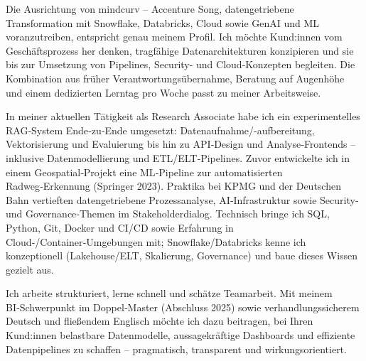 Die Ausrichtung von mindcurv – Accenture Song, datengetriebene Transformation mit Snowflake, Databricks, Cloud sowie GenAI und ML voranzutreiben, entspricht genau meinem Profil. Ich möchte Kund:innen vom Geschäftsprozess her denken, tragfähige Datenarchitekturen konzipieren und sie bis zur Umsetzung von Pipelines, Security- und Cloud-Konzepten begleiten. Die Kombination aus früher Verantwortungsübernahme, Beratung auf Augenhöhe und einem dedizierten Lerntag pro Woche passt zu meiner Arbeitsweise.

In meiner aktuellen Tätigkeit als Research Associate habe ich ein experimentelles RAG‑System Ende‑zu‑Ende umgesetzt: Datenaufnahme/-aufbereitung, Vektorisierung und Evaluierung bis hin zu API‑Design und Analyse‑Frontends – inklusive Datenmodellierung und ETL/ELT‑Pipelines. Zuvor entwickelte ich in einem Geospatial‑Projekt eine ML‑Pipeline zur automatisierten Radweg‑Erkennung (Springer 2023). Praktika bei KPMG und der Deutschen Bahn vertieften datengetriebene Prozessanalyse, AI‑Infrastruktur sowie Security‑ und Governance‑Themen im Stakeholderdialog. Technisch bringe ich SQL, Python, Git, Docker und CI/CD sowie Erfahrung in Cloud‑/Container‑Umgebungen mit; Snowflake/Databricks kenne ich konzeptionell (Lakehouse/ELT, Skalierung, Governance) und baue dieses Wissen gezielt aus.

Ich arbeite strukturiert, lerne schnell und schätze Teamarbeit. Mit meinem BI‑Schwerpunkt im Doppel‑Master (Abschluss 2025) sowie verhandlungssicherem Deutsch und fließendem Englisch möchte ich dazu beitragen, bei Ihren Kund:innen belastbare Datenmodelle, aussagekräftige Dashboards und effiziente Datenpipelines zu schaffen – pragmatisch, transparent und wirkungsorientiert.